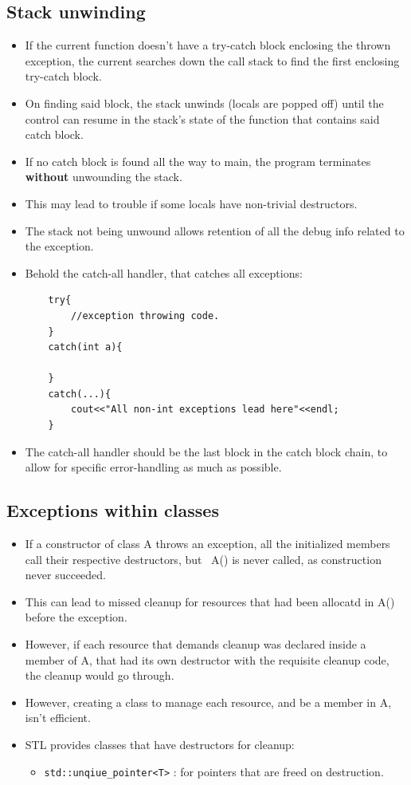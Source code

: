 \documentclass{report}
\begin{document}
\subsection{Stack unwinding}
\begin{itemize}
\item If the current function doesn't have a try-catch block enclosing the thrown exception,
the current searches down the call stack to find the first enclosing try-catch block.
\item On finding said block, the stack unwinds (locals are popped off) until the control can 
resume in the stack's state of the function that contains said catch block.
\item If no catch block is found all the way to main, the program terminates \textbf{without} unwounding the stack.
\item This may lead to trouble if some locals have non-trivial destructors.
\item The stack not being unwound allows retention of all the debug info related to the exception.
\item Behold the catch-all handler, that catches all exceptions:
\begin{lstlisting}
    try{
        //exception throwing code.
    }
    catch(int a){

    }
    catch(...){
        cout<<"All non-int exceptions lead here"<<endl;
    }
\end{lstlisting}
\item The catch-all handler should be the last block in the catch block chain,
to allow for specific error-handling as much as possible.
\end{itemize}
\subsection{Exceptions within classes}
\begin{itemize}
\item If a constructor of class A throws an exception, all the initialized members call their 
respective destructors, but ~A() is never called, as construction never succeeded.
\item This can lead to missed cleanup for resources that had been allocatd in A() before the exception.
\item However, if each resource that demands cleanup was declared inside a member of A, that had
its own destructor with the requisite cleanup code, the cleanup would go through.
\item However, creating a class to manage each resource, and be a member in A, isn't efficient.
\item STL provides classes that have destructors for cleanup:
\begin{itemize}
    \item \texttt{std::unqiue\_pointer<T>} : for pointers that are freed on destruction.
\end{itemize}
\end{itemize}
\end{document}
